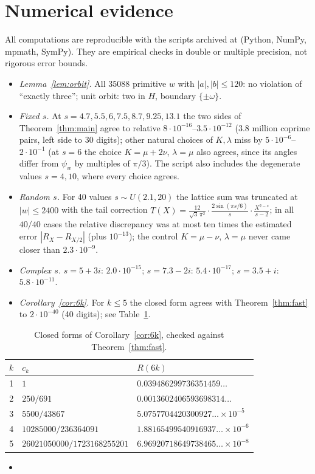 \documentclass[11pt]{article}
\theoremstyle{remark}
\begin{document}
\section{Numerical evidence}
All computations are reproducible with the scripts archived at \cite{Z} (Python, NumPy, mpmath, SymPy).
They are empirical checks in double or multiple precision, not rigorous error bounds.
\begin{itemize}
\item \emph{Lemma~\ref{lem:orbit}.} All $35088$ primitive $w$ with $|a|,|b|\le120$: no violation of ``exactly three''; unit orbit:
two in $H$, boundary $\{\pm\omega\}$.
\item \emph{Fixed $s$.} At $s=4.7,5.5,6,7.5,8.7,9.25,13.1$ the two sides of Theorem~\ref{thm:main} agree to relative
$8\cdot10^{-16}$--$3.5\cdot10^{-12}$ ($3.8$ million coprime pairs, left side to 30 digits); other natural choices of $K,\lambda$ miss by
$5\cdot10^{-6}$--$2\cdot10^{-1}$ (at $s=6$ the choice $K=\mu+2\nu$, $\lambda=\mu$ also agrees, since its angles differ from $\psi_w$ by multiples of $\pi/3$). The script also includes the degenerate values $s=4,10$, where every choice agrees.
\item \emph{Random $s$.} For 40 values $s\sim U(2.1,20)$ the lattice sum was truncated at $|w|\le2400$ with the tail correction
$T(X)=\frac{12}{\sqrt3\,\pi^2}\cdot\frac{2\sin(\pi s/6)}{s}\cdot\frac{X^{2-s}}{s-2}$; in all $40/40$ cases the relative discrepancy was at most
ten times the estimated error $|R_X-R_{X/2}|$ (plus $10^{-13}$); the control $K=\mu-\nu$, $\lambda=\mu$ never came closer than $2.3\cdot10^{-9}$.
\item \emph{Complex $s$.} $s=5+3i$: $2.0\cdot10^{-15}$; $s=7.3-2i$: $5.4\cdot10^{-17}$; $s=3.5+i$: $5.8\cdot10^{-11}$.
\item \emph{Corollary~\ref{cor:6k}.} For $k\le5$ the closed form agrees with Theorem~\ref{thm:fast} to $2\cdot10^{-40}$ (40 digits); see Table~\ref{tab:R6k}.
\end{itemize}
\begin{table}[h]\centering
\begin{tabular}{rll}\toprule
$k$ & $c_k$ & $R(6k)$\\\midrule
1 & $1$ & $0.039486299736351459\ldots$\\
2 & $250/691$ & $0.0013602406593698314\ldots$\\
3 & $5500/43867$ & $5.0757704420300927\ldots\times10^{-5}$\\
4 & $10285000/236364091$ & $1.88165499540916937\ldots\times10^{-6}$\\
5 & $26021050000/1723168255201$ & $6.96920718649738465\ldots\times10^{-8}$\\\bottomrule
\end{tabular}
\caption{Closed forms of Corollary~\ref{cor:6k}, checked against Theorem~\ref{thm:fast}.}\label{tab:R6k}
\end{table}
\begin{itemize}\item[]
\end{itemize}
\end{document}
